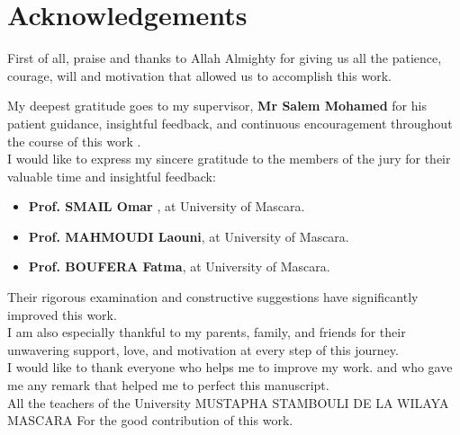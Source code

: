 \chapter*{Acknowledgements}
\thispagestyle{empty}
\begin{center}
	
	
	First of all, praise and thanks to Allah Almighty for giving us all the patience, courage, will and motivation that allowed us to accomplish this work.\\ 
	\vspace{0.3cm}
	
	My deepest gratitude goes to my supervisor, \textbf{Mr Salem Mohamed } for his patient guidance, insightful feedback, and continuous encouragement throughout the course of this work .\\
	\vspace{0.3cm}
	 I would like to express my sincere gratitude to the members of the jury for their valuable time and insightful feedback:
	 
	 \begin{itemize}
	 	\item \textbf{Prof. SMAIL Omar },  at University of Mascara.
	 	\item \textbf{Prof. MAHMOUDI Laouni}, at University of Mascara.
	 	\item \textbf{Prof. BOUFERA Fatma}, at University of Mascara.
	 	
	 \end{itemize}
	 
	 Their rigorous examination and constructive suggestions have significantly improved this work.\\
	\vspace{0.3cm}
    I am also especially thankful to my parents, family, and friends for their unwavering support, love, and motivation at every step of this journey. \\
    \vspace{0.3cm}
    I would like to thank everyone who helps me to improve my work. and who gave me any remark that helped me to perfect this manuscript.\\
	\vspace{0.3cm}
	All the teachers of the University MUSTAPHA STAMBOULI DE LA WILAYA MASCARA For the good contribution of this work.
\end{center}

